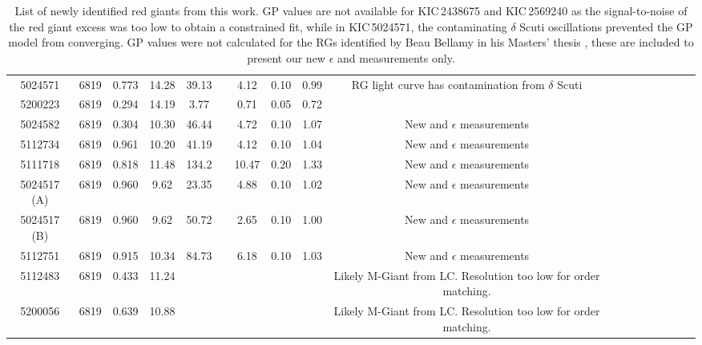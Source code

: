 \begin{table}
{\begin{tabular}{cccccccccccccccccl}
            5024571	&	6819	&	0.773	&	14.28		&	39.13		&         \textemdash       &	4.12	&		0.10	    &	0.99	&	RG light curve has contamination from $\delta$ Scuti\\
            5200223	&	6819	&	0.294	&	14.19		&	3.77		&						    &	0.71	&		0.05		&	0.72	&	\\
            \midrule
            5024582	&	6819	&	0.304	&	10.30		&	46.44		&         \textemdash       &	4.72	&		0.10		&	1.07	&	New \dnu{} and $\epsilon$ measurements\\
            5112734	&	6819	&	0.961	&	10.20		&	41.19		&         \textemdash       &	4.12	&		0.10		&	1.04	&	New \dnu{} and $\epsilon$ measurements\\
            5111718	&	6819	&	0.818	&	11.48		&	134.2		&         \textemdash       &	10.47	&		0.20		&	1.33	&	New \dnu{} and $\epsilon$ measurements\\
        5024517 (A)	&	6819	&	0.960	&	9.62		&	23.35		&         \textemdash       &	4.88	&		0.10		&	1.02	&	New \dnu{} and $\epsilon$ measurements\\
        5024517 (B)	&	6819	&	0.960	&	9.62		&	50.72		&         \textemdash       &	2.65	&		0.10		&	1.00	&	New \dnu{} and $\epsilon$ measurements\\
            5112751	&	6819	&	0.915	&	10.34		&	84.73		&         \textemdash       &	6.18	&		0.10		&	1.03	&	New \dnu{} and $\epsilon$ measurements\\
            \midrule
            5112483	&	6819	&	0.433	&	11.24		&\textemdash	&         \textemdash       &\textemdash&   \textemdash	&\textemdash	&	Likely M-Giant from LC. Resolution too low for order matching.\\
            5200056	&	6819	&	0.639	&	10.88		&\textemdash	&         \textemdash       &\textemdash&   \textemdash	&\textemdash	&	Likely M-Giant from LC. Resolution too low for order matching.\\

            \bottomrule
        \end{tabular}
    }
    \caption[List of newly identified red giants]{List of newly identified red giants from this work. GP \numax{} values are not available for KIC\,2438675 and KIC\,2569240 as the signal-to-noise of the red giant excess was too low to obtain a constrained fit, while in KIC\,5024571, the contaminating $\delta$ Scuti oscillations prevented the GP model from converging. GP \numax{} values were not calculated for the RGs identified by Beau Bellamy in his Masters' thesis \citep{bellamy_using_2015}, these are included to present our new $\epsilon$ and \dnu{} measurements only.}
    \label{tab:6791rgc}
\end{table}

